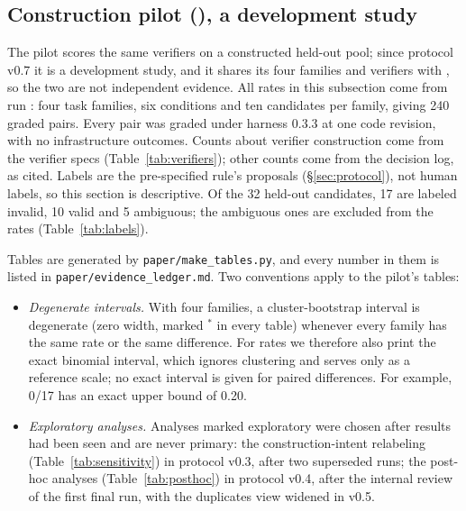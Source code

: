 \subsection{Construction pilot (\texttt{\PILOTRUN}), a development study}
\label{sec:results-pilot}
The pilot scores the same verifiers on a constructed held-out pool; since protocol v0.7 it is a development study, and it shares its four families and verifiers with \texttt{\FRESHRUN}, so the two are not independent evidence. All rates in this subsection come from run \texttt{\PILOTRUN}: four task families, six conditions and ten candidates per family, giving 240 graded pairs. Every pair was graded under harness 0.3.3 at one code revision, with no infrastructure outcomes. Counts about verifier construction come from the verifier specs (Table~\ref{tab:verifiers}); other counts come from the decision log, as cited. Labels are the pre-specified rule's proposals (\S\ref{sec:protocol}), not human labels, so this section is descriptive. Of the 32 held-out candidates, 17 are labeled invalid, 10 valid and 5 ambiguous; the ambiguous ones are excluded from the rates (Table~\ref{tab:labels}).

Tables are generated by \texttt{paper/make\_tables.py}, and every number in them is listed in \texttt{paper/evidence\_ledger.md}. Two conventions apply to the pilot's tables:
\begin{itemize}
\item \emph{Degenerate intervals.} With four families, a cluster-bootstrap interval is degenerate (zero width, marked $^{*}$ in every table) whenever every family has the same rate or the same difference. For rates we therefore also print the exact binomial interval, which ignores clustering and serves only as a reference scale; no exact interval is given for paired differences. For example, 0/17 has an exact upper bound of 0.20.
\item \emph{Exploratory analyses.} Analyses marked exploratory were chosen after results had been seen and are never primary: the construction-intent relabeling (Table~\ref{tab:sensitivity}) in protocol v0.3, after two superseded runs; the post-hoc analyses (Table~\ref{tab:posthoc}) in protocol v0.4, after the internal review of the first final run, with the duplicates view widened in v0.5.
\end{itemize}


